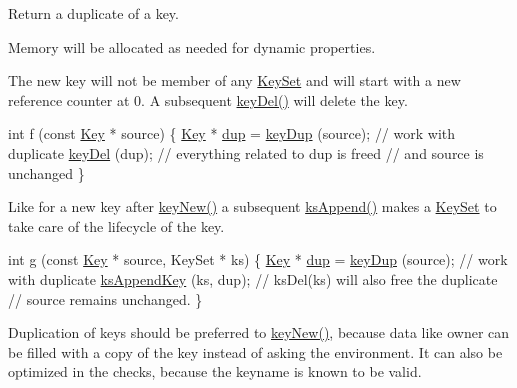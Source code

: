 Return a duplicate of a key.  

Memory will be allocated as needed for dynamic properties.

The new key will not be member of any \hyperlink{classkdb_1_1KeySet}{Key\-Set} and will start with a new reference counter at 0. A subsequent \hyperlink{group__key_ga3df95bbc2494e3e6703ece5639be5bb1}{key\-Del()} will delete the key.


\begin{DoxyCode}
\textcolor{keywordtype}{int} f (\textcolor{keyword}{const} \hyperlink{classkdb_1_1Key_a5679f5cae63caddd64a60388b9cc77fa}{Key} * source)
\{
        \hyperlink{classkdb_1_1Key_a5679f5cae63caddd64a60388b9cc77fa}{Key} * \hyperlink{classkdb_1_1Key_a43a1f28d7a0d40f0ded8473d480931ff}{dup} = \hyperlink{group__key_gae6ec6a60cc4b8c1463fa08623d056ce3}{keyDup} (source);
        \textcolor{comment}{// work with duplicate}
        \hyperlink{group__key_ga3df95bbc2494e3e6703ece5639be5bb1}{keyDel} (dup);
        \textcolor{comment}{// everything related to dup is freed}
        \textcolor{comment}{// and source is unchanged}
\}
\end{DoxyCode}


Like for a new key after \hyperlink{group__key_gad23c65b44bf48d773759e1f9a4d43b89}{key\-New()} a subsequent \hyperlink{group__keyset_ga21eb9c3a14a604ee3a8bdc779232e7b7}{ks\-Append()} makes a \hyperlink{classkdb_1_1KeySet}{Key\-Set} to take care of the lifecycle of the key.


\begin{DoxyCode}
\textcolor{keywordtype}{int} g (\textcolor{keyword}{const} \hyperlink{classkdb_1_1Key_a5679f5cae63caddd64a60388b9cc77fa}{Key} * source, KeySet * ks)
\{
        \hyperlink{classkdb_1_1Key_a5679f5cae63caddd64a60388b9cc77fa}{Key} * \hyperlink{classkdb_1_1Key_a43a1f28d7a0d40f0ded8473d480931ff}{dup} = \hyperlink{group__key_gae6ec6a60cc4b8c1463fa08623d056ce3}{keyDup} (source);
        \textcolor{comment}{// work with duplicate}
        \hyperlink{group__keyset_gaa5a1d467a4d71041edce68ea7748ce45}{ksAppendKey} (ks, dup);
        \textcolor{comment}{// ksDel(ks) will also free the duplicate}
        \textcolor{comment}{// source remains unchanged.}
\}
\end{DoxyCode}


Duplication of keys should be preferred to \hyperlink{group__key_gad23c65b44bf48d773759e1f9a4d43b89}{key\-New()}, because data like owner can be filled with a copy of the key instead of asking the environment. It can also be optimized in the checks, because the keyname is known to be valid.


